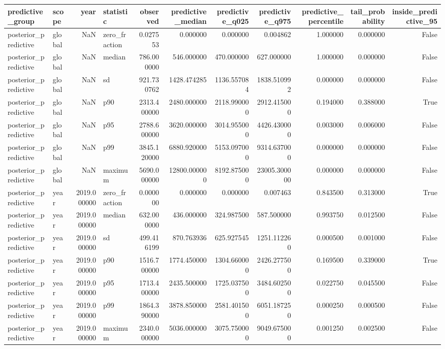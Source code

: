 \begin{tabular}{llrlrrrrrrr}
\toprule
predictive\_group & scope & year & statistic & observed & predictive\_median & predictive\_q025 & predictive\_q975 & predictive\_percentile & tail\_probability & inside\_predictive\_95 \\
\midrule
posterior\_predictive & global & NaN & zero\_fraction & 0.027553 & 0.000000 & 0.000000 & 0.004862 & 1.000000 & 0.000000 & False \\
posterior\_predictive & global & NaN & median & 786.000000 & 546.000000 & 470.000000 & 627.000000 & 1.000000 & 0.000000 & False \\
posterior\_predictive & global & NaN & sd & 921.730762 & 1428.474285 & 1136.557084 & 1838.510992 & 0.000000 & 0.000000 & False \\
posterior\_predictive & global & NaN & p90 & 2313.400000 & 2480.000000 & 2118.990000 & 2912.415000 & 0.194000 & 0.388000 & True \\
posterior\_predictive & global & NaN & p95 & 2788.600000 & 3620.000000 & 3014.955000 & 4426.430000 & 0.003000 & 0.006000 & False \\
posterior\_predictive & global & NaN & p99 & 3845.120000 & 6880.920000 & 5153.097000 & 9314.637000 & 0.000000 & 0.000000 & False \\
posterior\_predictive & global & NaN & maximum & 5690.000000 & 12800.000000 & 8192.875000 & 23005.300000 & 0.000000 & 0.000000 & False \\
posterior\_predictive & year & 2019.000000 & zero\_fraction & 0.000000 & 0.000000 & 0.000000 & 0.007463 & 0.843500 & 0.313000 & True \\
posterior\_predictive & year & 2019.000000 & median & 632.000000 & 436.000000 & 324.987500 & 587.500000 & 0.993750 & 0.012500 & False \\
posterior\_predictive & year & 2019.000000 & sd & 499.416199 & 870.763936 & 625.927545 & 1251.112260 & 0.000500 & 0.001000 & False \\
posterior\_predictive & year & 2019.000000 & p90 & 1516.700000 & 1774.450000 & 1304.660000 & 2426.277500 & 0.169500 & 0.339000 & True \\
posterior\_predictive & year & 2019.000000 & p95 & 1713.400000 & 2435.500000 & 1725.037500 & 3484.602500 & 0.022750 & 0.045500 & False \\
posterior\_predictive & year & 2019.000000 & p99 & 1864.390000 & 3878.850000 & 2581.401500 & 6051.187250 & 0.000250 & 0.000500 & False \\
posterior\_predictive & year & 2019.000000 & maximum & 2340.000000 & 5036.000000 & 3075.750000 & 9049.675000 & 0.001250 & 0.002500 & False \\

\end{tabular}
